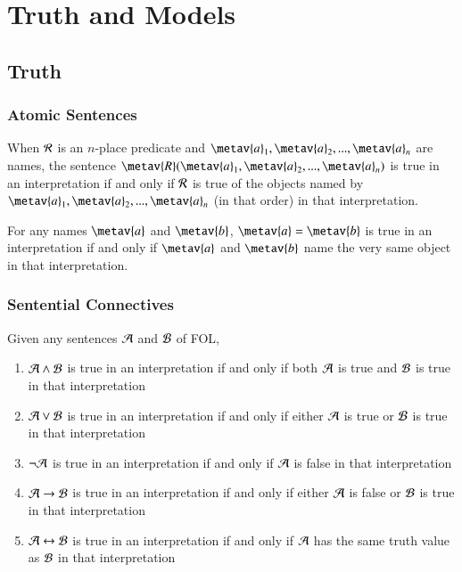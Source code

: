 \documentclass[12pt, a4paper, twoside, openright, titlepage]{book}
\begin{document}
\begin{rmk}{}{}
\begin{tikzpicture}[x=0.75pt,y=0.75pt,yscale=-1,xscale=1]
\end{tikzpicture}
\end{rmk}



\chapter{\textsection\textsection Truth and Models}


\section{\textsection Truth}

\subsection{\textsection Atomic Sentences}

\begin{defn}{}{}
    When $\metav{R}$ is an $n$-place predicate and $\metav{a}_1,\metav{a}_2,...,\metav{a}_n$ are names, the sentence $\metav{R}(\metav{a}_1,\metav{a}_2,...,\metav{a}_n)$ is true in an interpretation if and only if $\metav{R}$ is true of the objects named by $\metav{a}_1,\metav{a}_2,...,\metav{a}_n$ (in that order) in that interpretation.
\end{defn}


\begin{defn}{}{}
    For any names $\metav{a}$ and $\metav{b}$, $\metav{a} = \metav{b}$ is true in an interpretation if and only if $\metav{a}$ and $\metav{b}$ name the very same object in that interpretation.
\end{defn}

\subsection{\textsection Sentential Connectives}

\begin{defn}{}{}
    Given any sentences $\metav{A}$ and $\metav{B}$ of FOL, \begin{enumerate}
        \item $\metav{A}\eand \metav{B}$ is true in an interpretation if and only if both $\metav{A}$ is true and $\metav{B}$ is true in that interpretation
        \item $\metav{A}\eor \metav{B}$ is true in an interpretation if and only if either $\metav{A}$ is true or $\metav{B}$ is true in that interpretation
        \item $\enot \metav{A}$ is true in an interpretation if and only if $\metav{A}$ is false in that interpretation
        \item $\metav{A}\eif \metav{B}$ is true in an interpretation if and only if either $\metav{A}$ is false or $\metav{B}$ is true in that interpretation
        \item $\metav{A}\eiff \metav{B}$ is true in an interpretation if and only if $\metav{A}$ has the same truth value as $\metav{B}$ in that interpretation
    \end{enumerate}
\end{defn}
\end{document}
